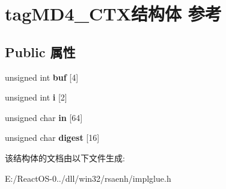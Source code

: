 \hypertarget{structtag_m_d4___c_t_x}{}\section{tag\+M\+D4\+\_\+\+C\+T\+X结构体 参考}
\label{structtag_m_d4___c_t_x}
\subsection*{Public 属性}
\begin{DoxyCompactItemize}
\item 
\mbox{\label{structtag_m_d4___c_t_x_a77ab2044b30dbb71aa584e091705166d}} 
unsigned int {\bfseries buf} \mbox{[}4\mbox{]}
\item 
\mbox{\label{structtag_m_d4___c_t_x_ae6ea585fb3733d31d837c4e9e8631ef1}} 
unsigned int {\bfseries i} \mbox{[}2\mbox{]}
\item 
\mbox{\label{structtag_m_d4___c_t_x_a8369bd3a4f9301b8f6ac7162e4571f81}} 
unsigned char {\bfseries in} \mbox{[}64\mbox{]}
\item 
\mbox{\label{structtag_m_d4___c_t_x_a5e978fe484ed5755cee6f73debc76f12}} 
unsigned char {\bfseries digest} \mbox{[}16\mbox{]}
\end{DoxyCompactItemize}


该结构体的文档由以下文件生成\+:\begin{DoxyCompactItemize}
\item 
E\+:/\+React\+O\+S-\/0../dll/win32/rsaenh/implglue.\+h\end{DoxyCompactItemize}
